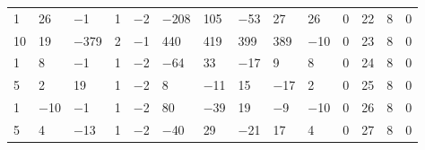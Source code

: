 \documentclass[pdftex]{sigma}
\numberwithin{equation}{section}
\theoremstyle{definition}
\numberwithin{table}{section}
\begin{document}
{\begin{paracol}{3}
\begin{supertabular}{|w{c}{.32cm}w{c}{.32cm}w{c}{.32cm}@{\hspace{.5cm}}w{c}{.2cm}w{c}{.2cm}|@{\hspace{\tabcolsep}}HHHHHHw{c}{.17cm}w{c}{.17cm}w{c}{.17cm}|}
			1 & 26 & $-$1 & 1 & $-$2 & $-$208 & 105 & $-$53 & 27 & 26 & 0 & 22 & 8 & 0 \\
			10 & 19 & $-$379 & 2 & $-$1 & 440 & 419 & 399 & 389 & $-$10 & 0 & 23 & 8 & 0 \\
			1 & 8 & $-$1 & 1 & $-$2 & $-$64 & 33 & $-$17 & 9 & 8 & 0 & 24 & 8 & 0 \\
			5 & 2 & 19 & 1 & $-$2 & 8 & $-$11 & 15 & $-$17 & 2 & 0 & 25 & 8 & 0 \\
			1 & $-$10 & $-$1 & 1 & $-$2 & 80 & $-$39 & 19 & $-$9 & $-$10 & 0 & 26 & 8 & 0 \\
			5 & 4 & $-$13 & 1 & $-$2 & $-$40 & 29 & $-$21 & 17 & 4 & 0 & 27 & 8 & 0 \\\hline
		\end{supertabular}
		
		\switchcolumn
		

\end{paracol}}
\end{document}
